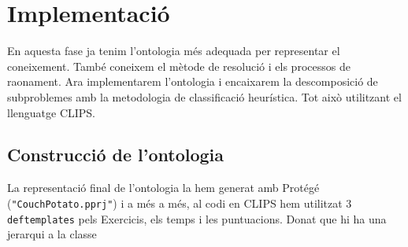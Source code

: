 \documentclass[a4paper, 12pt, UTF8]{article}
\begin{document}
\section{Implementació}

En aquesta fase ja tenim l'ontologia més adequada per representar el coneixement. També coneixem el mètode de resolució i els processos de raonament. Ara implementarem l'ontologia i encaixarem la descomposició de subproblemes amb la metodologia de classificació heurística. Tot això utilitzant el llenguatge CLIPS.

\subsection{Construcció de l'ontologia}

La representació final de l'ontologia la hem generat amb Protégé (\verb|"CouchPotato.pprj"|) i a més a més, al codi en CLIPS hem utilitzat 3 \verb|deftemplates| pels Exercicis, els temps i les puntuacions. Donat que hi ha una jerarqui a la classe 
\end{document}

